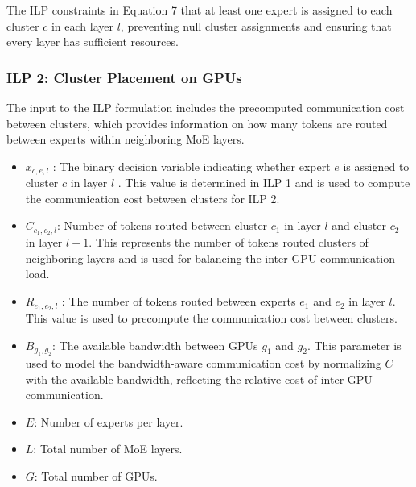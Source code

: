 The ILP constraints in Equation 7 that at least one expert is assigned to each cluster \( c \) in each layer \( l \), preventing null cluster assignments and ensuring that every layer has sufficient resources.

\subsubsection{ILP 2: Cluster Placement on GPUs}

The input to the ILP formulation includes the precomputed communication cost between clusters, which provides information on how many tokens are routed between experts within neighboring MoE layers.
%
\begin{itemize}[leftmargin=*]
    \vspace{-0.5em}
    \item  \( x_{c,e,l} \) : The binary decision variable indicating whether expert  \( e \)  is assigned to cluster  \( c \)  in layer  \( l \) . This value is determined in ILP 1 and is used to compute the communication cost between clusters for ILP 2.
    \vspace{-0.5em}
    \item \( C_{c_1,c_2,l} \): Number of tokens routed between cluster \( c_1 \) in layer \( l \) and cluster \( c_2 \) in layer \( l+1 \). This represents the number of tokens routed clusters of neighboring layers and is used for balancing the inter-GPU communication load.
    \vspace{-0.5em}
    \item \( R_{e_1, e_2, l} \) : The number of tokens routed between experts \( e_1 \)  and \( e_2 \) in layer \( l \). This value is used to precompute the communication cost between clusters.
    \vspace{-0.5em}
    \item \( B_{g_1,g_2} \): The available bandwidth between GPUs \( g_1 \) and \( g_2 \). This parameter is used to model the bandwidth-aware communication cost by normalizing \( C \) with the available bandwidth, reflecting the relative cost of inter-GPU communication.
    \vspace{-0.5em}
    \item \(E\): Number of experts per layer.
    \vspace{-0.5em}
    \item \(L\): Total number of MoE layers.
    \vspace{-0.5em}
    \item \(G\): Total number of GPUs.
\end{itemize}

